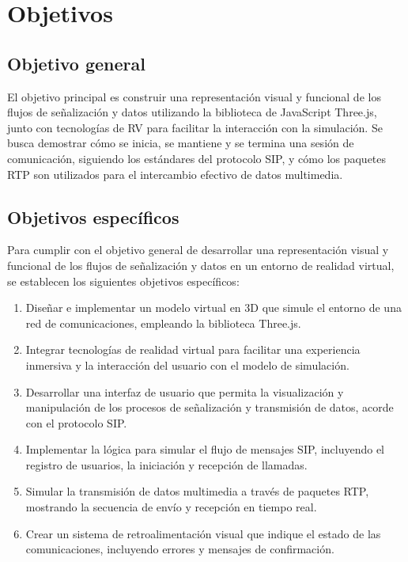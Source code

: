\documentclass[a4paper, 12pt]{book}
\begin{document}
\cleardoublepage %
\chapter{Objetivos} %
\label{chap:objetivos} %

\section{Objetivo general} %
\label{sec:objetivo-general} %

El objetivo principal es construir una representación visual y funcional de los flujos de señalización y 
datos utilizando la biblioteca de JavaScript Three.js, junto con tecnologías de RV para facilitar la interacción con la simulación. 
Se busca demostrar cómo se inicia, se mantiene y se termina una sesión de comunicación, siguiendo los estándares del protocolo SIP, 
y cómo los paquetes RTP son utilizados para el intercambio efectivo de datos multimedia.


\section{Objetivos específicos}
\label{sec:objetivos-especificos}
Para cumplir con el objetivo general de desarrollar una representación visual y funcional de los flujos de señalización 
y datos en un entorno de realidad virtual, se establecen los siguientes objetivos específicos:

\begin{enumerate}
\item Diseñar e implementar un modelo virtual en 3D que simule el entorno de una red de comunicaciones, empleando la biblioteca Three.js.
\item Integrar tecnologías de realidad virtual para facilitar una experiencia inmersiva y 
la interacción del usuario con el modelo de simulación.
\item Desarrollar una interfaz de usuario que permita la visualización y manipulación de los procesos de 
señalización y transmisión de datos, acorde con el protocolo SIP.
\item Implementar la lógica para simular el flujo de mensajes SIP, incluyendo el registro de usuarios, la iniciación y 
recepción de llamadas.
\item Simular la transmisión de datos multimedia a través de paquetes RTP, mostrando la secuencia de envío y recepción en tiempo real.
\item Crear un sistema de retroalimentación visual que indique el estado de las comunicaciones, incluyendo errores y mensajes de confirmación.
\end{enumerate}
\end{document}
